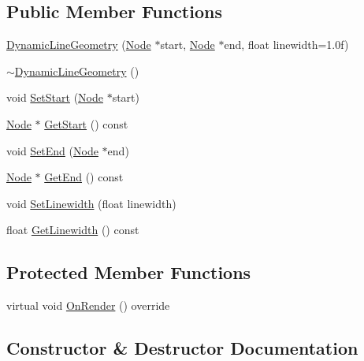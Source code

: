\subsection*{Public Member Functions}
\begin{DoxyCompactItemize}
\item 
\mbox{\hyperlink{classec_1_1_dynamic_line_geometry_aee7eb771e0a94232be982f57996fb9c9}{Dynamic\+Line\+Geometry}} (\mbox{\hyperlink{classec_1_1_node}{Node}} $\ast$start, \mbox{\hyperlink{classec_1_1_node}{Node}} $\ast$end, float linewidth=1.\+0f)
\item 
\mbox{\hyperlink{classec_1_1_dynamic_line_geometry_aee42706b172e0e76cd290a4ae6897740}{$\sim$\+Dynamic\+Line\+Geometry}} ()
\item 
void \mbox{\hyperlink{classec_1_1_dynamic_line_geometry_adf8d2d370ff59d9a8f46efb8d22ab10f}{Set\+Start}} (\mbox{\hyperlink{classec_1_1_node}{Node}} $\ast$start)
\item 
\mbox{\hyperlink{classec_1_1_node}{Node}} $\ast$ \mbox{\hyperlink{classec_1_1_dynamic_line_geometry_a3621c53431285af2906deb8bc9efaa20}{Get\+Start}} () const
\item 
void \mbox{\hyperlink{classec_1_1_dynamic_line_geometry_abe7141bed04108f1eba2b46d02d9204b}{Set\+End}} (\mbox{\hyperlink{classec_1_1_node}{Node}} $\ast$end)
\item 
\mbox{\hyperlink{classec_1_1_node}{Node}} $\ast$ \mbox{\hyperlink{classec_1_1_dynamic_line_geometry_a02b0da9617828219e6e6f8a9fe4331e7}{Get\+End}} () const
\item 
void \mbox{\hyperlink{classec_1_1_dynamic_line_geometry_af4e391fdfc0dc05ca8acb7740d898b9c}{Set\+Linewidth}} (float linewidth)
\item 
float \mbox{\hyperlink{classec_1_1_dynamic_line_geometry_ac8da282368b858fd7120e11c1a2ce7c3}{Get\+Linewidth}} () const
\end{DoxyCompactItemize}
\subsection*{Protected Member Functions}
\begin{DoxyCompactItemize}
\item 
virtual void \mbox{\hyperlink{classec_1_1_dynamic_line_geometry_aea2c2ade5a97294e579a559b20771275}{On\+Render}} () override
\end{DoxyCompactItemize}


\subsection{Constructor \& Destructor Documentation}
\mbox{\label{classec_1_1_dynamic_line_geometry_aee7eb771e0a94232be982f57996fb9c9}} 
